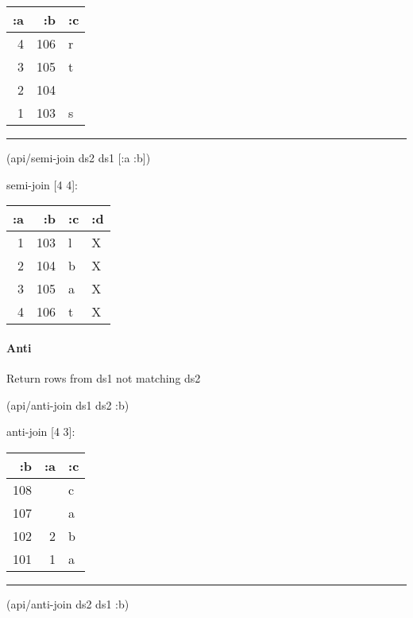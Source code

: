 \documentclass[]{article}
\newenvironment{Shaded}{\begin{snugshade}}{\end{snugshade}}
\newcommand{\AttributeTok}[1]{\textcolor[rgb]{0.77,0.63,0.00}{#1}}
\newcommand{\NormalTok}[1]{#1}
\let\oldparagraph\paragraph
\renewcommand{\paragraph}[1]{\oldparagraph{#1}\mbox{}}
\begin{document}
\begin{longtable}[]{@{}rrl@{}}
\toprule
:a & :b & :c\tabularnewline
\midrule
\endhead
4 & 106 & r\tabularnewline
3 & 105 & t\tabularnewline
2 & 104 &\tabularnewline
1 & 103 & s\tabularnewline
\bottomrule
\end{longtable}

\begin{center}\rule{0.5\linewidth}{0.5pt}\end{center}

\begin{Shaded}
\begin{Highlighting}[]
\NormalTok{(api/semi-join ds2 ds1 [}\AttributeTok{:a} \AttributeTok{:b}\NormalTok{])}
\end{Highlighting}
\end{Shaded}

semi-join {[}4 4{]}:

\begin{longtable}[]{@{}rrll@{}}
\toprule
:a & :b & :c & :d\tabularnewline
\midrule
\endhead
1 & 103 & l & X\tabularnewline
2 & 104 & b & X\tabularnewline
3 & 105 & a & X\tabularnewline
4 & 106 & t & X\tabularnewline
\bottomrule
\end{longtable}

\paragraph{Anti}\label{anti}

Return rows from ds1 not matching ds2

\begin{Shaded}
\begin{Highlighting}[]
\NormalTok{(api/anti-join ds1 ds2 }\AttributeTok{:b}\NormalTok{)}
\end{Highlighting}
\end{Shaded}

anti-join {[}4 3{]}:

\begin{longtable}[]{@{}rrl@{}}
\toprule
:b & :a & :c\tabularnewline
\midrule
\endhead
108 & & c\tabularnewline
107 & & a\tabularnewline
102 & 2 & b\tabularnewline
101 & 1 & a\tabularnewline
\bottomrule
\end{longtable}

\begin{center}\rule{0.5\linewidth}{0.5pt}\end{center}

\begin{Shaded}
\begin{Highlighting}[]
\NormalTok{(api/anti-join ds2 ds1 }\AttributeTok{:b}\NormalTok{)}
\end{Highlighting}
\end{Shaded}
\end{document}

